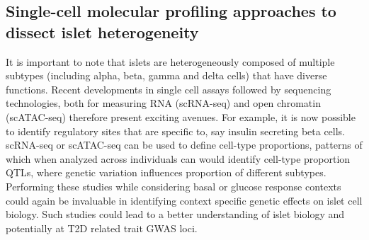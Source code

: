\subsection{Single-cell molecular profiling approaches to dissect islet heterogeneity}
It is important to note that islets are heterogeneously composed of multiple subtypes (including alpha, beta, gamma and delta cells) that have diverse functions. Recent developments in single cell assays followed by sequencing technologies, both for measuring RNA (scRNA-seq) and open chromatin (scATAC-seq) therefore present exciting avenues. For example, it is now possible to identify regulatory sites that are specific to, say insulin secreting beta cells. scRNA-seq or scATAC-seq can be used to define cell-type proportions, patterns of which when analyzed across individuals can would identify cell-type proportion QTLs, where genetic variation influences proportion of different subtypes. Performing these studies while considering basal or glucose response contexts could again be invaluable in identifying context specific genetic effects on islet cell biology. Such studies could lead to a better understanding of islet biology and potentially at T2D related trait GWAS loci.         
        
